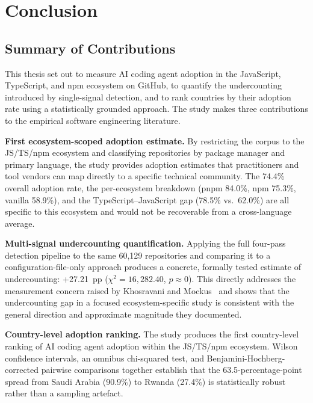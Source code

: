 
\chapter{Conclusion}
\label{chap:conclusion}

\section{Summary of Contributions}
\label{sec:conc:contributions}

This thesis set out to measure AI coding agent adoption in the JavaScript, TypeScript, and npm ecosystem on GitHub, to quantify the undercounting introduced by single-signal detection, and to rank countries by their adoption rate using a statistically grounded approach. The study makes three contributions to the empirical software engineering literature.

\textbf{First ecosystem-scoped adoption estimate.} By restricting the corpus to the JS/TS/npm ecosystem and classifying repositories by package manager and primary language, the study provides adoption estimates that practitioners and tool vendors can map directly to a specific technical community. The 74.4\% overall adoption rate, the per-ecosystem breakdown (pnpm 84.0\%, npm 75.3\%, vanilla 58.9\%), and the TypeScript--JavaScript gap (78.5\% vs.\ 62.0\%) are all specific to this ecosystem and would not be recoverable from a cross-language average.

\textbf{Multi-signal undercounting quantification.} Applying the full four-pass detection pipeline to the same 60,129 repositories and comparing it to a configuration-file-only approach produces a concrete, formally tested estimate of undercounting: +27.21~pp ($\chi^2 = 16{,}282.40$, $p \approx 0$). This directly addresses the measurement concern raised by Khosravani and Mockus~\cite{khosravani2026} and shows that the undercounting gap in a focused ecosystem-specific study is consistent with the general direction and approximate magnitude they documented.

\textbf{Country-level adoption ranking.} The study produces the first country-level ranking of AI coding agent adoption within the JS/TS/npm ecosystem. Wilson confidence intervals, an omnibus chi-squared test, and Benjamini-Hochberg-corrected pairwise comparisons together establish that the 63.5-percentage-point spread from Saudi Arabia (90.9\%) to Rwanda (27.4\%) is statistically robust rather than a sampling artefact.

